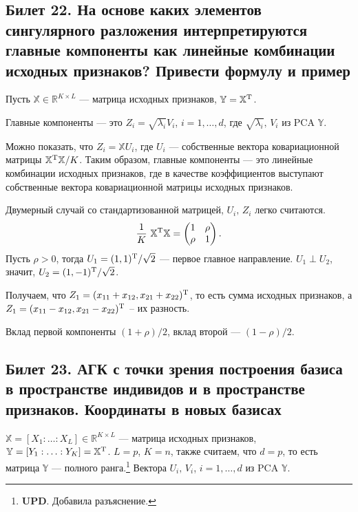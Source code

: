 \subsection{ Билет 22. На основе каких элементов сингулярного разложения интерпретируются главные компоненты как линейные комбинации исходных признаков? Привести формулу и пример}

Пусть $\mathbb{X} \in \mathbb{R}^{K\times L}$ --- матрица исходных признаков, $\mathbb{Y} = \mathbb{X}^{\rm T}$.

Главные компоненты --- это $Z_i = \sqrt{\lambda_i} V_i$, $i = 1,\ldots, d$, где $\sqrt{\lambda_i},\, V_i$ из PCA $\mathbb{Y}$.

Можно показать, что $Z_i = \mathbb{X}U_i$, где $U_i$ --- собственные вектора ковариационной матрицы
$\mathbb{X}^{\rm T}\mathbb{X}/K$.
Таким образом, главные компоненты --- это линейные комбинации исходных признаков, где в качестве коэффициентов выступают собственные вектора ковариационной матрицы исходных признаков.

\begin{ex}
Двумерный случай со стандартизованной матрицей, $U_i,\, Z_i$ легко считаются.
\begin{gather*}
\frac{1}{K}\ \mathbb{X}^{\rm T}\mathbb{X} = 
\begin{pmatrix}
  1 & \rho \\
  \rho & 1
\end{pmatrix}.
\end{gather*}
Пусть $\rho > 0$, тогда $U_1 = (1, 1)^{\rm T}/\sqrt{2}$ --- первое главное направление.
$U_1 \perp U_2$, значит, $U_2 = (1, -1)^{\rm T}/\sqrt{2}$.

Получаем, что $Z_1 = (x_{11} + x_{12}, x_{21} + x_{22})^{\rm T}$, то есть сумма исходных признаков, а  
$Z_1 = (x_{11} - x_{12}, x_{21} - x_{22})^{\rm T}$ -- их разность.

Вклад первой компоненты $(1 + \rho)/2$, вклад второй --- $(1 - \rho)/2$.

\end{ex}  

\subsection{ Билет 23. АГК с точки зрения построения базиса в пространстве индивидов и в пространстве признаков. Координаты в новых базисах}

$\mathbb{X} = [X_1:\ldots:X_L]\in \mathbb{R}^{K\times L}$ --- матрица исходных признаков, $\mathbb{Y} = [Y_1:\ldots:Y_K] = \mathbb{X}^{\rm T}$.
$L = p$, $K = n$, также считаем, что $d = p$, то есть матрица $\mathbb{Y}$ --- полного ранга.\footnote{{\bf UPD}. Добавила разъяснение.}
Вектора $U_i,\, V_i$, $i = 1,\ldots, d$ из PCA $\mathbb{Y}$.

